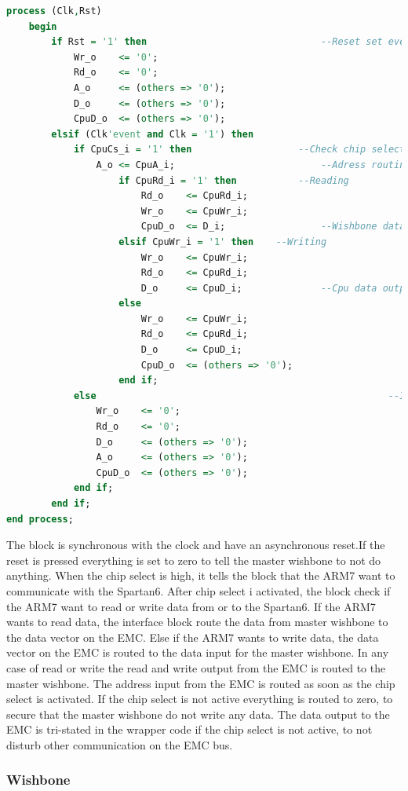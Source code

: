 \begin{lstlisting}[language=VHDL]
process (Clk,Rst)
	begin  
		if Rst = '1' then								--Reset set everything to 0
			Wr_o	<= '0';
			Rd_o	<= '0';
			A_o		<= (others => '0');
			D_o		<= (others => '0');
			CpuD_o	<= (others => '0');
		elsif (Clk'event and Clk = '1') then
			if CpuCs_i = '1' then					--Check chip select
				A_o	<= CpuA_i;							--Adress routing
					if CpuRd_i = '1' then			--Reading
						Rd_o	<= CpuRd_i;
						Wr_o	<= CpuWr_i;
						CpuD_o	<= D_i;					--Wishbone data out to Cpu data input
					elsif CpuWr_i = '1' then	--Writing
						Wr_o	<= CpuWr_i;					
						Rd_o	<= CpuRd_i;
						D_o		<= CpuD_i;				--Cpu data output to wishbone data input
					else
						Wr_o	<= CpuWr_i;		
						Rd_o	<= CpuRd_i;
						D_o		<= CpuD_i;
						CpuD_o	<= (others => '0');
					end if;
			else													--If chip select not high everything is set to 0
				Wr_o	<= '0';	
				Rd_o	<= '0';
				D_o		<= (others => '0');
				A_o		<= (others => '0');
				CpuD_o	<= (others => '0');
			end if;
		end if;
end process;
\end{lstlisting}
The block is synchronous with the clock and have an asynchronous reset.If the reset is pressed everything is set to zero to tell the master wishbone to not do anything. When the chip select is high, it tells the block that the ARM7 want to communicate with the Spartan6. After chip select i activated, the block check if the ARM7 want to read or write data from or to the Spartan6. If the ARM7 wants to read data, the interface block route the data from master wishbone to the data vector on the EMC. Else if the ARM7 wants to write data, the data vector on the EMC is routed to the data input for the master wishbone. In any case of read or write the read and write output from the EMC is routed to the master wishbone. The address input from the EMC is routed as soon as the chip select is activated. If the chip select is not active everything is routed to zero, to secure that the master wishbone do not write any data. The data output to the EMC is tri-stated in the wrapper code if the chip select is not active, to not disturb other communication on the EMC bus.

\subsubsection{Wishbone}

